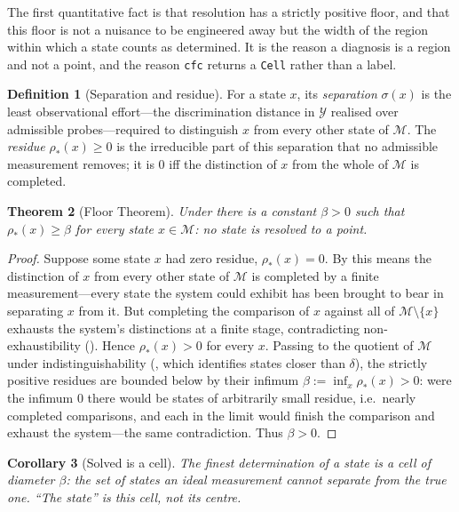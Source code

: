 \documentclass[11pt,a4paper]{article}
\theoremstyle{cfcthm}
\newtheorem{theorem}{Theorem}[section]
\newtheorem{corollary}[theorem]{Corollary}
\theoremstyle{definition}
\newtheorem{definition}[theorem]{Definition}
\theoremstyle{remark}
\newcommand{\Man}{\mathcal{M}}          %
\newcommand{\st}{x}                     %
\newcommand{\flo}{\beta}                %
\newcommand{\Rd}{\rho}                  %
\newcommand{\set}[1]{\{#1\}}
\newcommand{\cf}[1]{\texttt{#1}}
\begin{document}
The first quantitative fact is that resolution has a strictly positive floor,
and that this floor is not a nuisance to be engineered away but the width of
the region within which a state counts as determined. It is the reason a
diagnosis is a region and not a point, and the reason \cf{cfc} returns a
\cf{Cell} rather than a label.

\begin{definition}[Separation and residue]
\label{def:residue}
For a state $\st$, its \emph{separation} $\sigma(\st)$ is the least
observational effort---the discrimination distance in $\mathcal{Y}$ realised
over admissible probes---required to distinguish $\st$ from every other state
of $\Man$. The \emph{residue} $\Rd_{\ast}(\st)\ge0$ is the irreducible part of
this separation that no admissible measurement removes; it is $0$ iff the
distinction of $\st$ from the whole of $\Man$ is completed.
\end{definition}

\begin{theorem}[Floor Theorem]
\label{thm:floor}
Under  there is a constant $\flo>0$ such that
$\Rd_{\ast}(\st)\ge\flo$ for every state $\st\in\Man$: no state is resolved to
a point.
\end{theorem}

\begin{proof}
Suppose some state $\st$ had zero residue, $\Rd_{\ast}(\st)=0$. By
 this means the distinction of $\st$ from every other state
of $\Man$ is completed by a finite measurement---every state the system could
exhibit has been brought to bear in separating $\st$ from it. But completing
the comparison of $\st$ against all of $\Man\setminus\set{\st}$ exhausts the
system's distinctions at a finite stage, contradicting non-exhaustibility
(). Hence $\Rd_{\ast}(\st)>0$ for every $\st$. Passing to
the quotient of $\Man$ under indistinguishability (, which
identifies states closer than $\delta$), the strictly positive residues are
bounded below by their infimum $\flo:=\inf_{\st}\Rd_{\ast}(\st)>0$: were the
infimum $0$ there would be states of arbitrarily small residue, i.e.\ nearly
completed comparisons, and each in the limit would finish the comparison and
exhaust the system---the same contradiction. Thus $\flo>0$.
\end{proof}

\begin{corollary}[Solved is a cell]
\label{cor:cell}
The finest determination of a state is a \emph{cell} of diameter $\flo$: the
set of states an ideal measurement cannot separate from the true one. ``The
state'' is this cell, not its centre.
\end{corollary}
\end{document}
